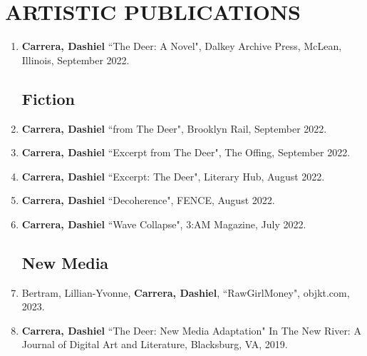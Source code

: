  \section{ARTISTIC PUBLICATIONS}
 \begin{enumerate}
 
 \subsection{Novels}
 \item \textbf{Carrera, Dashiel} ``The Deer: A Novel", Dalkey Archive Press, McLean, Illinois, September 2022. \\
 
\subsection{Fiction}
\item \textbf{Carrera, Dashiel} ``from The Deer", Brooklyn Rail, September 2022. \\
\item \textbf{Carrera, Dashiel} ``Excerpt from The Deer", The Offing, September 2022. \\
\item \textbf{Carrera, Dashiel} ``Excerpt: The Deer", Literary Hub, August 2022. \\
\item \textbf{Carrera, Dashiel} ``Decoherence", FENCE, August 2022. \\
\item \textbf{Carrera, Dashiel} ``Wave Collapse", 3:AM Magazine, July 2022. \\


\subsection{New Media}
\item Bertram, Lillian-Yvonne, \textbf{Carrera, Dashiel}, ``RawGirlMoney", objkt.com, 2023.
\item \textbf{Carrera, Dashiel} ``The Deer: New Media Adaptation" In The New River: A Journal of Digital Art and Literature, Blacksburg, VA, 2019.\\


\end{enumerate}
